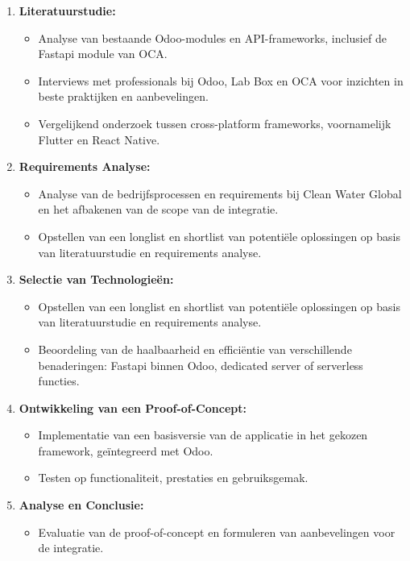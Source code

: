 \begin{enumerate}
    \item \textbf{Literatuurstudie:}
    \begin{itemize}
        \item Analyse van bestaande Odoo-modules en API-frameworks, inclusief de Fastapi module van OCA.
        \item Interviews met professionals bij Odoo, Lab Box en OCA voor inzichten in beste praktijken en aanbevelingen.
        \item Vergelijkend onderzoek tussen cross-platform frameworks, voornamelijk Flutter en React Native.
    \end{itemize}
    
    \item \textbf{Requirements Analyse:}
    \begin{itemize}
        \item Analyse van de bedrijfsprocessen en requirements bij Clean Water Global en het afbakenen van de scope van de integratie. 
        \item Opstellen van een longlist en shortlist van potentiële oplossingen op basis van literatuurstudie en requirements analyse.
    \end{itemize}

    \item \textbf{Selectie van Technologieën:}
    \begin{itemize}
        \item Opstellen van een longlist en shortlist van potentiële oplossingen op basis van literatuurstudie en requirements analyse.
        \item Beoordeling van de haalbaarheid en efficiëntie van verschillende benaderingen: Fastapi binnen Odoo, dedicated server of serverless functies.
    \end{itemize}

    \item \textbf{Ontwikkeling van een Proof-of-Concept:}
    \begin{itemize}
        \item Implementatie van een basisversie van de applicatie in het gekozen framework, geïntegreerd met Odoo.
        \item Testen op functionaliteit, prestaties en gebruiksgemak.
    \end{itemize}

    \item \textbf{Analyse en Conclusie:}
    \begin{itemize}
        \item Evaluatie van de proof-of-concept en formuleren van aanbevelingen voor de integratie.
    \end{itemize}
\end{enumerate}

